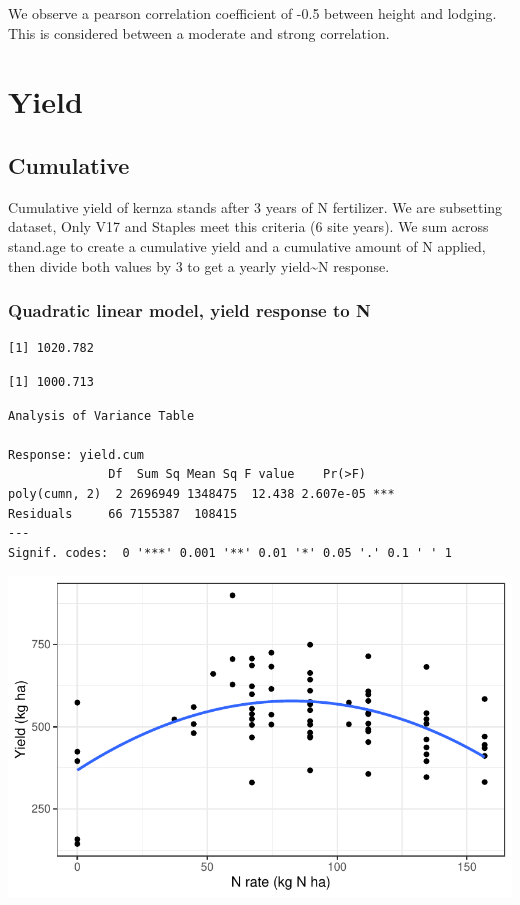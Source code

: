 \documentclass[
  letterpaper,
  DIV=11,
  numbers=noendperiod]{scrartcl}
\begin{document}
We observe a pearson correlation coefficient of -0.5 between height and
lodging. This is considered between a moderate and strong correlation.

\hypertarget{yield}{%
\section{Yield}\label{yield}}

\hypertarget{cumulative}{%
\subsection{Cumulative}\label{cumulative}}

Cumulative yield of kernza stands after 3 years of N fertilizer. We are
subsetting dataset, Only V17 and Staples meet this criteria (6 site
years). We sum across stand.age to create a cumulative yield and a
cumulative amount of N applied, then divide both values by 3 to get a
yearly yield\textasciitilde N response.

\hypertarget{quadratic-linear-model-yield-response-to-n}{%
\subsubsection{Quadratic linear model, yield response to
N}\label{quadratic-linear-model-yield-response-to-n}}

\begin{verbatim}
[1] 1020.782
\end{verbatim}

\begin{verbatim}
[1] 1000.713
\end{verbatim}

\begin{verbatim}
Analysis of Variance Table

Response: yield.cum
              Df  Sum Sq Mean Sq F value    Pr(>F)    
poly(cumn, 2)  2 2696949 1348475  12.438 2.607e-05 ***
Residuals     66 7155387  108415                      
---
Signif. codes:  0 '***' 0.001 '**' 0.01 '*' 0.05 '.' 0.1 ' ' 1
\end{verbatim}

\includegraphics{nrate_draft_files/figure-pdf/unnamed-chunk-12-1.pdf}
\end{document}
